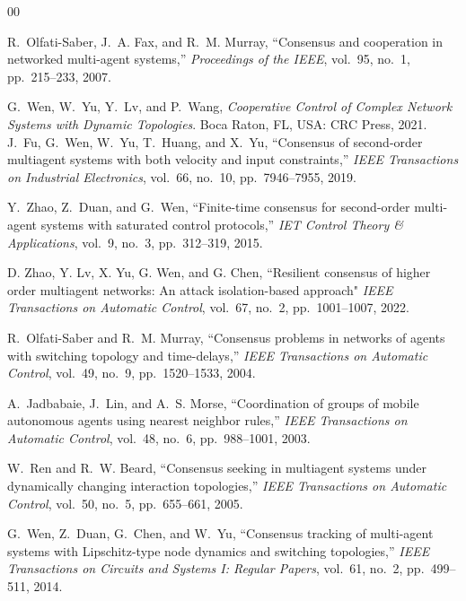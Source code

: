 \documentclass[conference]{IEEEtran}
\begin{document}
	\begin{thebibliography}{00}
		
		R.~Olfati-Saber, J.~A. Fax, and R.~M. Murray,
		``Consensus and cooperation in networked multi-agent systems,''
		\emph{Proceedings of the IEEE},
		vol.~95, no.~1, pp.~215--233, 2007.

		G.~Wen, W.~Yu, Y.~Lv, and P.~Wang,
		\emph{Cooperative Control of Complex Network Systems with
			Dynamic Topologies}.
		Boca Raton, FL, USA: CRC Press, 2021.		
		J.~Fu, G.~Wen, W.~Yu, T.~Huang, and X.~Yu,
		``Consensus of second-order multiagent systems with both velocity
		and input constraints,''
		\emph{IEEE Transactions on Industrial Electronics},
		vol.~66, no.~10, pp.~7946--7955, 2019.
		
		Y.~Zhao, Z.~Duan, and G.~Wen,
		``Finite-time consensus for second-order multi-agent systems with
		saturated control protocols,''
		\emph{IET Control Theory \& Applications},
		vol.~9, no.~3, pp.~312--319, 2015.
		
		D. Zhao, Y. Lv, X. Yu, G. Wen, and G. Chen, ``Resilient consensus of higher order multiagent networks: An attack isolation-based approach"
		\emph{IEEE Transactions on Automatic Control},
		vol.~67, no.~2, pp.~1001--1007, 2022.
		
		
		
		R.~Olfati-Saber and R.~M. Murray,
		``Consensus problems in networks of agents with switching topology
		and time-delays,''
		\emph{IEEE Transactions on Automatic Control},
		vol.~49, no.~9, pp.~1520--1533, 2004.

       
		
		A.~Jadbabaie, J.~Lin, and A.~S. Morse,
		``Coordination of groups of mobile autonomous agents using nearest
		neighbor rules,''
		\emph{IEEE Transactions on Automatic Control},
		vol.~48, no.~6, pp.~988--1001, 2003.
		
		W.~Ren and R.~W. Beard,
		``Consensus seeking in multiagent systems under dynamically
		changing interaction topologies,''
		\emph{IEEE Transactions on Automatic Control},
		vol.~50, no.~5, pp.~655--661, 2005.
		
		G.~Wen, Z.~Duan, G.~Chen, and W.~Yu,
		``Consensus tracking of multi-agent systems with Lipschitz-type
		node dynamics and switching topologies,''
		\emph{IEEE Transactions on Circuits and Systems I:
			Regular Papers},
		vol.~61, no.~2, pp.~499--511, 2014.
		

\end{thebibliography}
\end{document}
